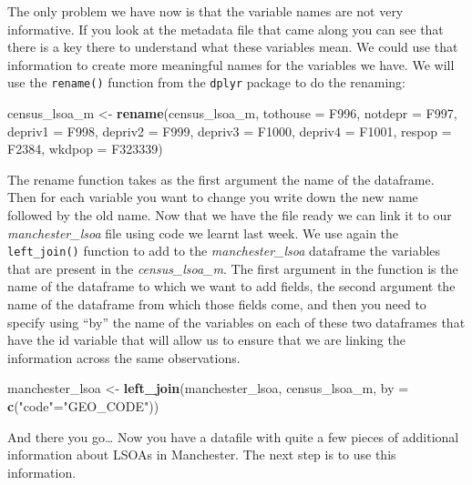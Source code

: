 \documentclass[]{book}
\newenvironment{Shaded}{\begin{snugshade}}{\end{snugshade}}
\newcommand{\DataTypeTok}[1]{\textcolor[rgb]{0.13,0.29,0.53}{#1}}
\newcommand{\KeywordTok}[1]{\textcolor[rgb]{0.13,0.29,0.53}{\textbf{#1}}}
\newcommand{\NormalTok}[1]{#1}
\newcommand{\StringTok}[1]{\textcolor[rgb]{0.31,0.60,0.02}{#1}}
\begin{document}
The only problem we have now is that the variable names are not very informative. If you look at the metadata file that came along you can see that there is a key there to understand what these variables mean. We could use that information to create more meaningful names for the variables we have. We will use the \texttt{rename()} function from the \texttt{dplyr} package to do the renaming:

\begin{Shaded}
\begin{Highlighting}[]
\NormalTok{census_lsoa_m <-}\StringTok{ }\KeywordTok{rename}\NormalTok{(census_lsoa_m, }\DataTypeTok{tothouse =}\NormalTok{ F996, }\DataTypeTok{notdepr =}\NormalTok{ F997, }\DataTypeTok{depriv1 =}\NormalTok{ F998,}
                        \DataTypeTok{depriv2 =}\NormalTok{ F999, }\DataTypeTok{depriv3 =}\NormalTok{ F1000, }\DataTypeTok{depriv4 =}\NormalTok{ F1001, }\DataTypeTok{respop =}\NormalTok{ F2384,}
                        \DataTypeTok{wkdpop =}\NormalTok{ F323339)}
\end{Highlighting}
\end{Shaded}

The rename function takes as the first argument the name of the dataframe. Then for each variable you want to change you write down the new name followed by the old name. Now that we have the file ready we can link it to our \emph{manchester\_lsoa} file using code we learnt last week. We use again the \texttt{left\_join()} function to add to the \emph{manchester\_lsoa} dataframe the variables that are present in the \emph{census\_lsoa\_m}. The first argument in the function is the name of the dataframe to which we want to add fields, the second argument the name of the dataframe from which those fields come, and then you need to specify using ``by'' the name of the variables on each of these two dataframes that have the id variable that will allow us to ensure that we are linking the information across the same observations.

\begin{Shaded}
\begin{Highlighting}[]
\NormalTok{manchester_lsoa <-}\StringTok{ }\KeywordTok{left_join}\NormalTok{(manchester_lsoa, census_lsoa_m, }\DataTypeTok{by =} \KeywordTok{c}\NormalTok{(}\StringTok{"code"}\NormalTok{=}\StringTok{"GEO_CODE"}\NormalTok{))}
\end{Highlighting}
\end{Shaded}

And there you go\ldots{} Now you have a datafile with quite a few pieces of additional information about LSOAs in Manchester. The next step is to use this information.
\end{document}
